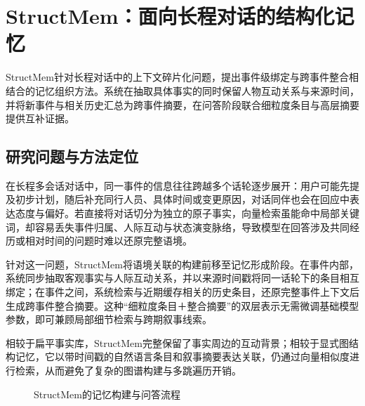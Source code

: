 \section{StructMem：面向长程对话的结构化记忆}
\label{sec:structmem}

StructMem针对长程对话中的上下文碎片化问题，提出事件级绑定与跨事件整合相结合的记忆组织方法。系统在抽取具体事实的同时保留人物互动关系与来源时间，并将新事件与相关历史汇总为跨事件摘要，在问答阶段联合细粒度条目与高层摘要提供互补证据。

\subsection{研究问题与方法定位}

在长程多会话对话中，同一事件的信息往往跨越多个话轮逐步展开：用户可能先提及初步计划，随后补充同行人员、具体时间或变更原因，对话同伴也会在回应中表达态度与偏好。若直接将对话切分为独立的原子事实，向量检索虽能命中局部关键词，却容易丢失事件归属、人际互动与状态演变脉络，导致模型在回答涉及共同经历或相对时间的问题时难以还原完整语境。

针对这一问题，StructMem将语境关联的构建前移至记忆形成阶段。在事件内部，系统同步抽取客观事实与人际互动关系，并以来源时间戳将同一话轮下的条目相互绑定；在事件之间，系统检索与近期缓存相关的历史条目，还原完整事件上下文后生成跨事件整合摘要。这种“细粒度条目＋整合摘要”的双层表示无需微调基础模型参数，即可兼顾局部细节检索与跨期叙事线索。

相较于扁平事实库，StructMem完整保留了事实周边的互动背景；相较于显式图结构记忆，它以带时间戳的自然语言条目和叙事摘要表达关联，仍通过向量相似度进行检索，从而避免了复杂的图谱构建与多跳遍历开销。

\begin{figure}[!htbp]
\centering
{}
\caption{StructMem的记忆构建与问答流程}
\label{fig:structmem-flow}
\end{figure}

